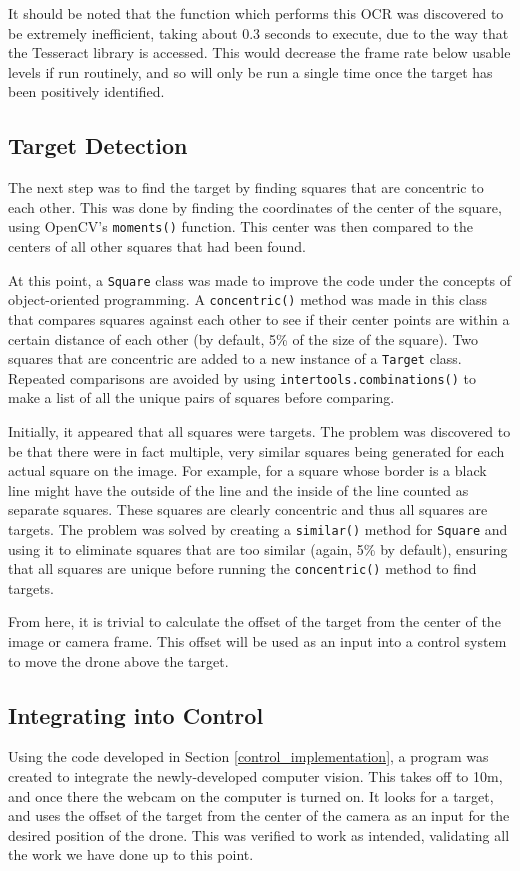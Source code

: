 \documentclass[11pt,twoside]{article}
\begin{document}
It should be noted that the function which performs this OCR was discovered to be extremely inefficient, taking about 0.3 seconds to execute, due to the way that the Tesseract library is accessed. This would decrease the frame rate below usable levels if run routinely, and so will only be run a single time once the target has been positively identified.

\subsection{Target Detection}
The next step was to find the target by finding squares that are concentric to each other. This was done by finding the coordinates of the center of the square, using OpenCV's \lstinline|moments()| function. This center was then compared to the centers of all other squares that had been found.

At this point, a \lstinline|Square| class was made to improve the code under the concepts of object-oriented programming. A \lstinline|concentric()| method was made in this class that compares squares against each other to see if their center points are within a certain distance of each other (by default, 5\% of the size of the square). Two squares that are concentric are added to a new instance of a \lstinline|Target| class. Repeated comparisons are avoided by using \lstinline|intertools.combinations()| to make a list of all the unique pairs of squares before comparing.

Initially, it appeared that all squares were targets. The problem was discovered to be that there were in fact multiple, very similar squares being generated for each actual square on the image. For example, for a square whose border is a black line might have the outside of the line and the inside of the line counted as separate squares. These squares are clearly concentric and thus all squares are targets. The problem was solved by creating a \lstinline|similar()| method for \lstinline|Square| and using it to eliminate squares that are too similar (again, 5\% by default), ensuring that all squares are unique before running the \lstinline|concentric()| method to find targets.

From here, it is trivial to calculate the offset of the target from the center of the image or camera frame. This offset will be used as an input into a control system to move the drone above the target.

\subsection{Integrating into Control}
Using the code developed in Section \ref{control_implementation}, a program was created to integrate the newly-developed computer vision. This takes off to 10m, and once there the webcam on the computer is turned on. It looks for a target, and uses the offset of the target from the center of the camera as an input for the desired position of the drone. This was verified to work as intended, validating all the work we have done up to this point.
\end{document}

